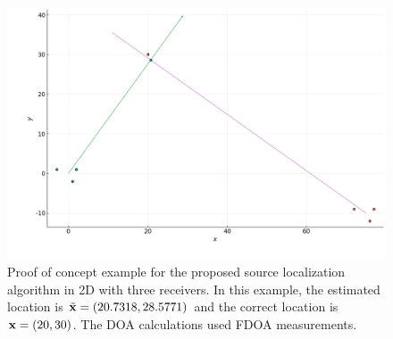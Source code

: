 \begin{figure}[H]
  \includegraphics[scale=0.4]{DOA_proofofconcept}
  \caption{Proof of concept example for the proposed source localization algorithm in 2D with three receivers. In this example, the estimated location is $\tilde{\mathbf{x}} = (20.7318,28.5771)$ and the correct location is $\mathbf{x} = (20,30)$. The DOA calculations used FDOA measurements.}
  \label{fig:doa}
\end{figure}
